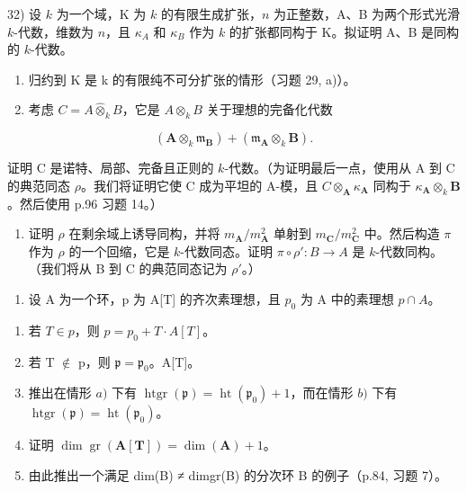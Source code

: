 32) 设 \(k\) 为一个域，K 为 \(k\) 的有限生成扩张，\(n\) 为正整数，A、B 为两个形式光滑 \(k\)-代数，维数为 \(n\)，且 \(\kappa_{A}\) 和 \(\kappa_{B}\) 作为 \(k\) 的扩张都同构于 K。拟证明 A、B 是同构的 \(k\)-代数。

\begin{enumerate}
\def\labelenumi{\alph{enumi})}
\item
  归约到 K 是 k 的有限纯不可分扩张的情形（习题 29, a)）。
\item
  考虑 \(C = A \hat{\otimes}_{k} B\)，它是 \(A \otimes_{k} B\) 关于理想的完备化代数
\end{enumerate}

\[
\left(\mathbf {A} \otimes_ {k} \mathfrak {m} _ {\mathbf {B}}\right) + \left(\mathfrak {m} _ {\mathbf {A}} \otimes_ {k} \mathbf {B}\right).
\]

证明 C 是诺特、局部、完备且正则的 \(k\)-代数。（为证明最后一点，使用从 A 到 C 的典范同态 \(\rho\)。我们将证明它使 C 成为平坦的 A-模，且 \(C \otimes_{\mathbf{A}} \kappa_{\mathbf{A}}\) 同构于 \(\kappa_{\mathbf{A}} \otimes_{k} \mathbf{B}\)。然后使用 p.96 习题 14。）

\begin{enumerate}
\def\labelenumi{\alph{enumi})}
\setcounter{enumi}{2}
\tightlist
\item
  证明 \(\rho\) 在剩余域上诱导同构，并将 \(m_{\mathbf{A}}/m_{\mathbf{A}}^{2}\) 单射到 \(m_{\mathbf{C}}/m_{\mathbf{C}}^{2}\) 中。然后构造 \(\pi\) 作为 \(\rho\) 的一个回缩，它是 \(k\)-代数同态。证明 \(\pi \circ \rho': B \to A\) 是 \(k\)-代数同构。（我们将从 B 到 C 的典范同态记为 \(\rho'\)。）
\end{enumerate}


\begin{enumerate}
\def\labelenumi{\arabic{enumi})}
\tightlist
\item
  设 A 为一个环，p 为 A{[}T{]} 的齐次素理想，且 \(p_{0}\) 为 A 中的素理想 \(p \cap A\)。
\end{enumerate}

\begin{enumerate}
\def\labelenumi{\alph{enumi})}
\item
  若 \(T \in p\)，则 \(p = p_{0} + T \cdot A[T]\)。
\item
  若 T \(\notin\) p，则 \(\mathfrak{p} = \mathfrak{p}_0\)。A{[}T{]}。
\item
  推出在情形 \(a)\) 下有 \(\operatorname{htgr}(\mathfrak{p}) = \operatorname{ht}(\mathfrak{p}_0) + 1\)，而在情形 \(b)\) 下有 \(\operatorname{htgr}(\mathfrak{p}) = \operatorname{ht}(\mathfrak{p}_0)\)。
\item
  证明 \(\dim \operatorname{gr}(\mathbf{A}[\mathbf{T}]) = \dim (\mathbf{A}) + 1\)。
\item
  由此推出一个满足 dim(B) ≠ dimgr(B) 的分次环 B 的例子（p.84, 习题 7）。
\end{enumerate}


